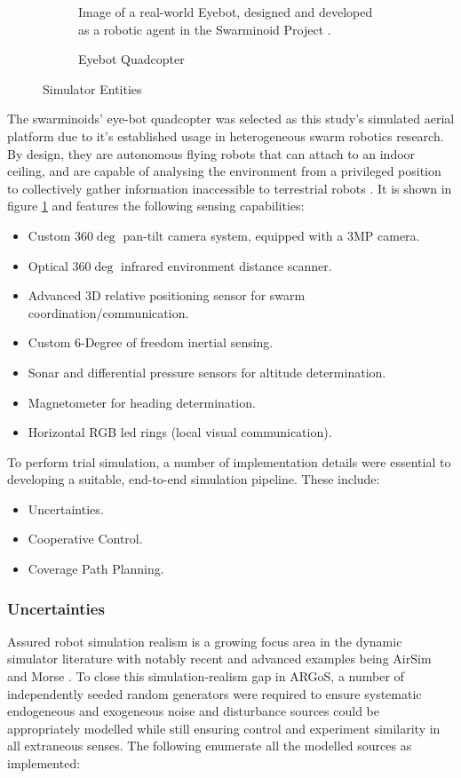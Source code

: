 \documentclass{report}
\begin{document}
\begin{figure}
\begin{subfigure}[b]{0.4\textwidth}
		\caption{Eyebot Quadcopter}
		\label{fig:eyebot_hardware}
		{Image of a real-world Eyebot, designed and developed as a robotic agent in the Swarminoid Project \cite{Dorigo2013}}.
	\end{subfigure}
	\caption{Simulator Entities}
	\label{fig:sim_orig}
\end{figure}

The swarminoids' \cite{Dorigo2013} eye-bot quadcopter was selected as this study's simulated aerial platform due to it's established usage in heterogeneous swarm robotics research. By design, they are autonomous flying robots that can attach to an indoor ceiling, and are capable of analysing the environment from a privileged position to collectively gather information inaccessible to terrestrial robots \cite{Dorigo2013}. It is shown in figure \ref{fig:eyebot_hardware} and features the following sensing capabilities:
\begin{itemize}
    \item Custom $360\deg$ pan-tilt camera system, equipped with a 3MP camera.
    \item Optical $360\deg$ infrared environment distance scanner.
    \item Advanced 3D relative positioning sensor for swarm coordination/communication.
    \item Custom 6-Degree of freedom inertial sensing.
    \item Sonar and differential pressure sensors for altitude determination.
    \item Magnetometer for heading determination.
    \item Horizontal RGB led rings (local visual communication).
\end{itemize}

To perform trial simulation, a number of implementation details were essential to developing a suitable, end-to-end simulation pipeline. These include:
\begin{itemize}
	\item Uncertainties.
	\item Cooperative Control.
	\item Coverage Path Planning.
\end{itemize}

\subsubsection{Uncertainties}
Assured robot simulation realism is a growing focus area \cite{Taylor2014} in the dynamic simulator literature with notably recent and advanced examples being AirSim \cite{Shah2018} and Morse \cite{Morse2011} \cite{Lemaignan2014}. To close this simulation-realism gap in ARGoS, a number of independently seeded random generators were required to ensure systematic endogeneous and exogeneous noise and disturbance sources could be appropriately modelled while still ensuring control and experiment similarity in all extraneous senses. The following enumerate all the modelled sources as implemented:
\end{document}
